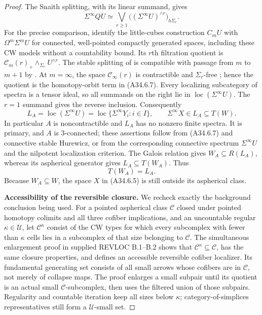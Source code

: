 \begin{proof}
The Snaith splitting, with its linear summand, gives
\[
 \Sigma^\infty QU\simeq
 \bigvee_{r\geq1}
      \bigl((\Sigma^\infty U)^{\wedge r}\bigr)_{h\Sigma_r}.
 \tag{A34.6.7}
\]
For the precise comparison, \citet[Theorems~2.7 and~6.1]{A3May1972}
identify the little-cubes construction $C_mU$ with
$\Omega^m\Sigma^mU$ for connected, well-pointed compactly generated
spaces, including these CW models without a countability bound.
Its $r$th filtration quotient is
$\mathcal C_m(r)_+\wedge_{\Sigma_r}U^{\wedge r}$.
The stable splitting of \citet[Theorem~1.1 and Section~2]{ASnaith}
is compatible with passage from $m$ to $m+1$ by
\citet[Remark~3.6]{ASnaith}.  At $m=\infty$, the space
$\mathcal C_\infty(r)$ is contractible and $\Sigma_r$-free
\citep[Corollary~4.6 and Theorem~4.8]{A3May1972}; hence the
quotient is the homotopy-orbit term in \textup{(A34.6.7)}.
Every localizing subcategory of spectra is a tensor ideal, so
all summands on the right lie in
$\operatorname{loc}(\Sigma^\infty U)$.
The $r=1$ summand gives the reverse inclusion.  Consequently
\[
 L_A=\operatorname{loc}(\Sigma^\infty U)
     =\operatorname{loc}\{\Sigma^\infty Y_i:i\in I\},
 \qquad \Sigma^\infty X\in L_A\subseteq T(W).
 \tag{A34.6.8}
\]
In particular $A$ is noncontractible and $L_A$ has no nonzero
finite spectra.  It is primary, and $A$ is $3$-connected;
these assertions follow from \textup{(A34.6.7)} and connective
stable Hurewicz, or from the corresponding connective spectrum
$\Sigma^\infty U$ and the nilpotent localization criterion.
The Galois relation gives $W_A\subseteq R(L_A)$, whereas its
aspherical generator gives $L_A\subseteq T(W_A)$.  Thus
\[
                         T(W_A)=L_A.
 \tag{A34.6.9}
\]
Because $W_A\subseteq W$, the space $X$ in
\textup{(A34.6.5)} is still outside its aspherical class.

\par\medskip\noindent\textbf{Accessibility of the reversible closure.}\quad
We recheck exactly the background conclusion being used.
For a pointed aspherical class $\mathcal C$ closed under pointed
homotopy colimits and all three cofiber implications, and an
uncountable regular $\kappa\in\mathcal U$, let
$\mathcal C^\kappa$ consist of the CW types for which every
subcomplex with fewer than $\kappa$ cells lies in a subcomplex
of that size belonging to $\mathcal C$.
The simultaneous enlargement proof in supplied REVLOC B.1--B.2
shows that $\mathcal C^\kappa\subseteq\mathcal C$, has the same
closure properties, and defines an accessible reversible cofiber
localizer.  Its fundamental generating set consists of all small
arrows whose cofibers are in $\mathcal C$, not merely of collapse
maps.  The proof enlarges a small subpair until its quotient is
an actual small $\mathcal C$-subcomplex, then uses the filtered
union of those subpairs.  Regularity and countable iteration keep
all sizes below $\kappa$; category-of-simplices representatives
still form a $\mathcal U$-small set.


\end{proof}
